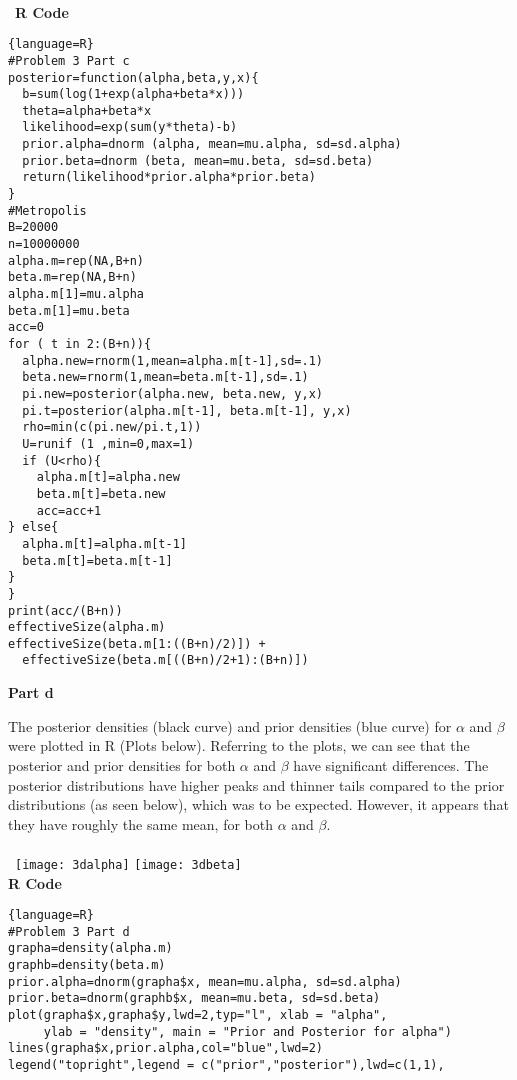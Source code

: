 \documentclass[12pt]{article}
\newenvironment{problem}[2][Problem]{\begin{trivlist}
\item[\hskip \labelsep {\bfseries #1}\hskip \labelsep {\bfseries #2.}]}{\end{trivlist}}
\begin{document}
\begin{problem}{3}
\\\
\textbf{R Code}
\begin{lstlisting}{language=R}
#Problem 3 Part c
posterior=function(alpha,beta,y,x){
  b=sum(log(1+exp(alpha+beta*x))) 
  theta=alpha+beta*x
  likelihood=exp(sum(y*theta)-b)
  prior.alpha=dnorm (alpha, mean=mu.alpha, sd=sd.alpha)
  prior.beta=dnorm (beta, mean=mu.beta, sd=sd.beta)
  return(likelihood*prior.alpha*prior.beta)
}
#Metropolis   
B=20000
n=10000000
alpha.m=rep(NA,B+n)
beta.m=rep(NA,B+n)
alpha.m[1]=mu.alpha
beta.m[1]=mu.beta
acc=0
for ( t in 2:(B+n)){
  alpha.new=rnorm(1,mean=alpha.m[t-1],sd=.1)
  beta.new=rnorm(1,mean=beta.m[t-1],sd=.1) 
  pi.new=posterior(alpha.new, beta.new, y,x)
  pi.t=posterior(alpha.m[t-1], beta.m[t-1], y,x) 
  rho=min(c(pi.new/pi.t,1))
  U=runif (1 ,min=0,max=1) 
  if (U<rho){
    alpha.m[t]=alpha.new
    beta.m[t]=beta.new
    acc=acc+1
} else{
  alpha.m[t]=alpha.m[t-1]
  beta.m[t]=beta.m[t-1]
}
}
print(acc/(B+n))
effectiveSize(alpha.m)
effectiveSize(beta.m[1:((B+n)/2)]) +
  effectiveSize(beta.m[((B+n)/2+1):(B+n)])
\end{lstlisting}
\newpage
\begin{flushleft}
\textbf{Part d}
\end{flushleft}
The posterior densities (black curve) and prior densities (blue curve) for $\alpha$ and $\beta$ were plotted in R (Plots below). Referring to the plots, we can see that the posterior and prior densities for both $\alpha$ and $\beta$ have significant differences. The posterior distributions have higher peaks and thinner tails compared to the prior distributions (as seen below), which was to be expected. However, it appears that they have roughly the same mean, for both  $\alpha$ and $\beta$. \\
\\\
\texttt{[image: 3dalpha]}
\texttt{[image: 3dbeta]}\\
\textbf{R Code}
\begin{lstlisting}{language=R}
#Problem 3 Part d
grapha=density(alpha.m)
graphb=density(beta.m)
prior.alpha=dnorm(grapha$x, mean=mu.alpha, sd=sd.alpha)
prior.beta=dnorm(graphb$x, mean=mu.beta, sd=sd.beta)
plot(grapha$x,grapha$y,lwd=2,typ="l", xlab = "alpha", 
     ylab = "density", main = "Prior and Posterior for alpha")
lines(grapha$x,prior.alpha,col="blue",lwd=2)
legend("topright",legend = c("prior","posterior"),lwd=c(1,1), 

\end{lstlisting}
\end{problem}
\end{document}

